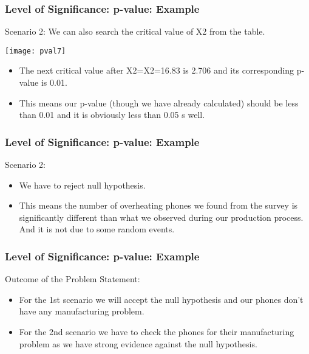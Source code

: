 \begin{frame}[fragile]\frametitle{Level of Significance: p-value: Example}
Scenario 2:
We can also search the critical value of X2 from the table. 
\begin{center}
\texttt{[image: pval7]}
\end{center}

\begin{itemize}
\item The next critical value after X2=X2=16.83 is 2.706 and its corresponding p-value is 0.01. 
\item This means our p-value (though we have already calculated) should be less than 0.01 and it is obviously less than 0.05 s well.
\end{itemize}
\end{frame}

\begin{frame}[fragile]\frametitle{Level of Significance: p-value: Example}
Scenario 2:
\begin{itemize}
\item We have to reject null hypothesis. 
\item This means the number of overheating phones we found from the survey is significantly different than what we observed during our production process. And it is not due to some random events.
\end{itemize}
\end{frame}

\begin{frame}[fragile]\frametitle{Level of Significance: p-value: Example}
Outcome of the Problem Statement:
\begin{itemize}
\item For the 1st scenario we will accept the null hypothesis and our phones don’t have any manufacturing problem.
\item For the 2nd scenario we have to check the phones for their manufacturing problem as we have strong evidence against the null hypothesis.
\end{itemize}
\end{frame}


